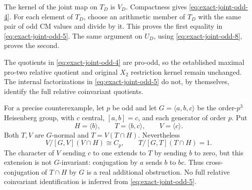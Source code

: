 The kernel of the joint map on \(T_D\) is \(V_D\).
Compactness gives \eqref{eq:exact-joint-odd-4}.
For each element of \(T_D\), choose an arithmetic member
of \(T_D\) with the same pair of odd CM values and divide
by it. This proves the first equality in \eqref{eq:exact-joint-odd-5}.
The same argument on \(U_D\), using \eqref{eq:exact-joint-odd-8}, proves the second.

\begin{remark}
The quotients in \eqref{eq:exact-joint-odd-4} are pro-odd, so the established
maximal pro-two relative quotient and original \(X_2\)
restriction kernel remain unchanged.
The internal factorizations in \eqref{eq:exact-joint-odd-5} do not, by themselves,
identify the full relative coinvariant quotients.

For a precise counterexample, let \(p\) be odd and let
\(G=\langle a,b,c\rangle\) be the order-\(p^3\) Heisenberg
group, with \(c\) central, \([a,b]=c\), and each generator
of order \(p\). Put
\[
 H=\langle b\rangle,\qquad T=\langle b,c\rangle,\qquad
 V=\langle c\rangle.
\]
Both \(T,V\) are \(G\)-normal and \(T=V(T\cap H)\).
Nevertheless
\[
 V/[G,V](V\cap H)\cong C_p,\qquad
 T/[G,T](T\cap H)=1.
\]
The character of \(V\) sending \(c\) to one extends to \(T\)
by sending \(b\) to zero, but this extension is not
\(G\)-invariant: conjugation by \(a\) sends \(b\) to \(bc\).
Thus cross-conjugation of \(T\cap H\) by \(G\) is a real
additional obstruction. No full relative coinvariant
identification is inferred from \eqref{eq:exact-joint-odd-5}.
\end{remark}
